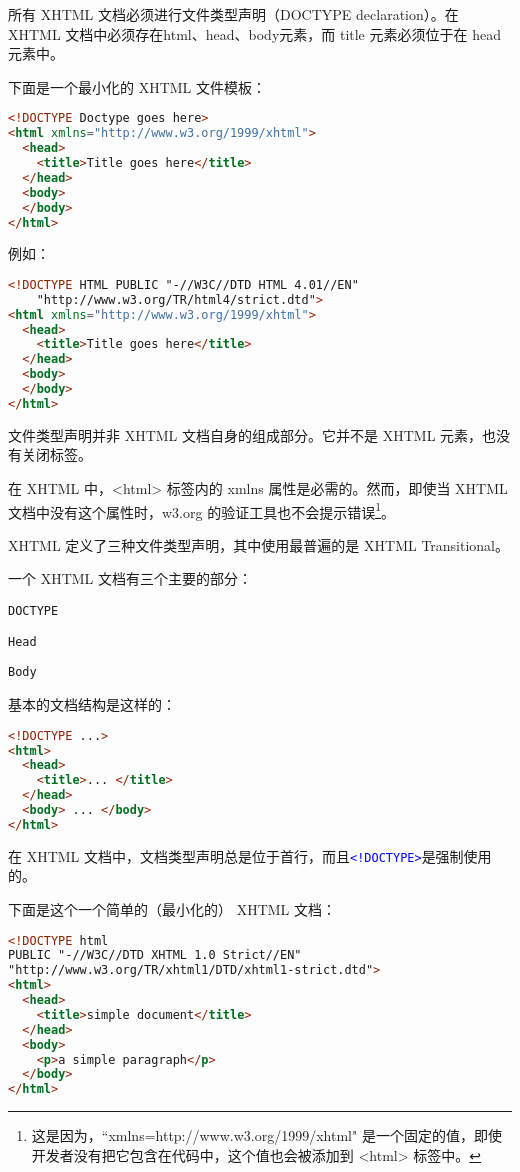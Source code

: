 所有 XHTML 文档必须进行文件类型声明（DOCTYPE declaration）。在 XHTML 文档中必须存在html、head、body元素，而 title 元素必须位于在 head 元素中。

下面是一个最小化的 XHTML 文件模板：

\begin{lstlisting}[language=HTML]
<!DOCTYPE Doctype goes here>
<html xmlns="http://www.w3.org/1999/xhtml">
  <head>
    <title>Title goes here</title>
  </head>
  <body>
  </body>
</html>
\end{lstlisting}

例如：

\begin{lstlisting}[language=HTML]
<!DOCTYPE HTML PUBLIC "-//W3C//DTD HTML 4.01//EN"
	"http://www.w3.org/TR/html4/strict.dtd">
<html xmlns="http://www.w3.org/1999/xhtml">
  <head>
    <title>Title goes here</title>
  </head>
  <body>
  </body>
</html>
\end{lstlisting}

文件类型声明并非 XHTML 文档自身的组成部分。它并不是 XHTML 元素，也没有关闭标签。

在 XHTML 中，<html> 标签内的 xmlns 属性是必需的。然而，即使当 XHTML 文档中没有这个属性时，w3.org 的验证工具也不会提示错误\footnote{这是因为，``xmlns=http://www.w3.org/1999/xhtml" 是一个固定的值，即使开发者没有把它包含在代码中，这个值也会被添加到 <html> 标签中。}。

XHTML 定义了三种文件类型声明，其中使用最普遍的是 XHTML Transitional。



一个 XHTML 文档有三个主要的部分：

\begin{compactitem}
\item \texttt{DOCTYPE}
\item \texttt{Head}
\item \texttt{Body}
\end{compactitem}

基本的文档结构是这样的：

\begin{lstlisting}[language=HTML]
<!DOCTYPE ...>
<html>
  <head>
    <title>... </title>
  </head>
  <body> ... </body>
</html>
\end{lstlisting}

在 XHTML 文档中，文档类型声明总是位于首行，而且\texttt{\textcolor{Blue}{<!DOCTYPE>}}是强制使用的。

下面是这个一个简单的（最小化的） XHTML 文档：

\begin{lstlisting}[language=HTML]
<!DOCTYPE html
PUBLIC "-//W3C//DTD XHTML 1.0 Strict//EN"
"http://www.w3.org/TR/xhtml1/DTD/xhtml1-strict.dtd">
<html>
  <head>
    <title>simple document</title>
  </head>
  <body>
    <p>a simple paragraph</p>
  </body>
</html>
\end{lstlisting}

